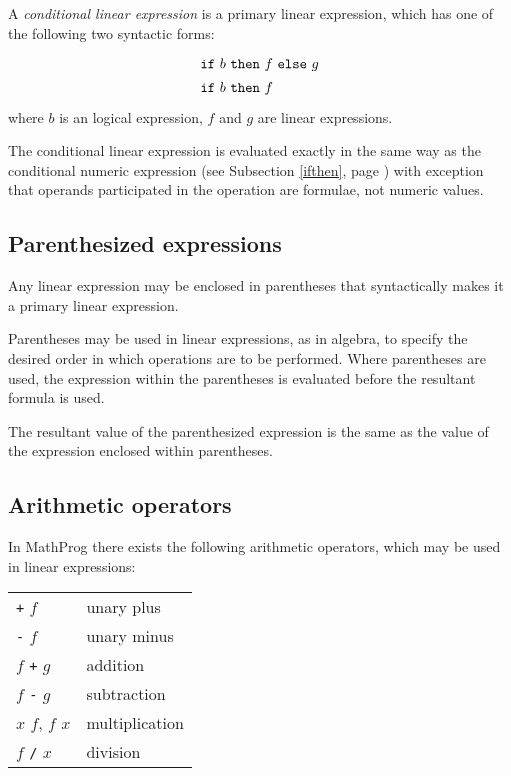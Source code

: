 \documentclass[11pt]{report}
\begin{document}
A {\it conditional linear expression} is a primary linear expression,
which has one of the following two syntactic forms:
$$
{\def\arraystretch{1.4}
\begin{array}{l}
\mbox{{\tt if} $b$ {\tt then} $f$ {\tt else} $g$}\\
\mbox{{\tt if} $b$ {\tt then} $f$}\\
\end{array}
}
$$
where $b$ is an logical expression, $f$ and $g$ are linear expressions.

\newpage

The conditional linear expression is evaluated exactly in the same way
as the conditional numeric expression (see Subsection \ref{ifthen},
page \pageref{ifthen}) with exception that operands participated in the
operation are formulae, not numeric values.

\subsection{Parenthesized expressions}

Any linear expression may be enclosed in parentheses that syntactically
makes it a primary linear expression.

Parentheses may be used in linear expressions, as in algebra, to
specify the desired order in which operations are to be performed.
Where parentheses are used, the expression within the parentheses is
evaluated before the resultant formula is used.

The resultant value of the parenthesized expression is the same as the
value of the expression enclosed within parentheses.

\subsection{Arithmetic operators}

In MathProg there exists the following arithmetic operators, which may
be used in linear expressions:

\begin{tabular}{@{}ll@{}}
{\tt+} $f$&unary plus\\
{\tt-} $f$&unary minus\\
$f$ {\tt+} $g$&addition\\
$f$ {\tt-} $g$&subtraction\\
$x$ {\tt*} $f$, $f$ {\tt*} $x$&multiplication\\
$f$ {\tt/} $x$&division
\end{tabular}
\end{document}
